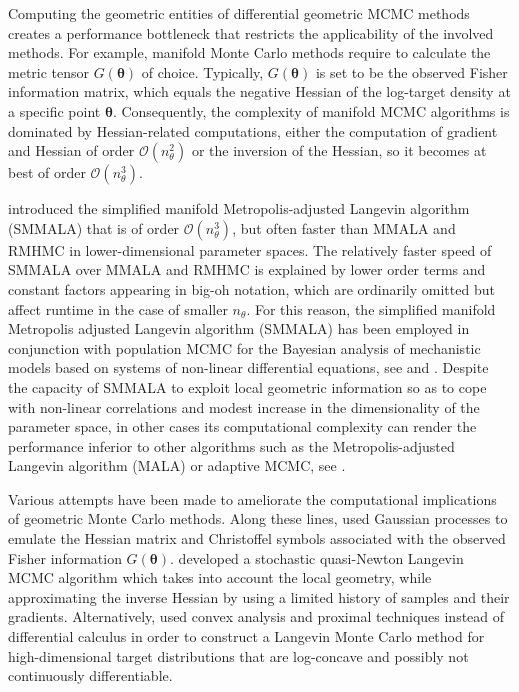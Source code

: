 \documentclass[twoside,11pt]{article}
\begin{document}
Computing the geometric entities of differential geometric MCMC methods creates a performance bottleneck that restricts the 
applicability of the involved methods. For example, manifold Monte Carlo methods require to calculate the metric tensor
$G(\boldsymbol{\theta})$ of choice. Typically, $G(\boldsymbol{\theta})$ is set to be the observed Fisher information matrix,
which equals the negative Hessian of the log-target density at a specific point $\boldsymbol{\theta}$.
Consequently, the complexity of manifold MCMC algorithms is dominated by Hessian-related computations, either the computation of gradient and Hessian of order  $\mathcal{O}(n_\theta^2)$ or the inversion of the Hessian, so it becomes at best of order $\mathcal{O}(n_\theta^3)$.

\cite{gir_cal__rie} introduced the simplified manifold Metropolis-adjusted Langevin algorithm (SMMALA) that is of order $\mathcal{O}(n_\theta^3)$, but often faster than MMALA and RMHMC in lower-dimensional parameter spaces. The 
relatively faster speed of SMMALA over MMALA and RMHMC is explained by lower order terms and constant factors appearing in 
big-oh notation, which are ordinarily omitted but affect runtime in the case of smaller $n_\theta$. For this reason, the 
simplified manifold Metropolis adjusted Langevin algorithm (SMMALA) has been employed in conjunction with population MCMC 
for the Bayesian analysis of mechanistic models based on systems of non-linear differential equations, see 
\cite{cal_gir__sta} and \cite{sch_pap__ews}. Despite the capacity of SMMALA to exploit local geometric information so as to 
cope with non-linear correlations and modest increase in the dimensionality of the parameter space, in other cases its 
computational complexity can render the performance inferior to other algorithms such as the Metropolis-adjusted Langevin 
algorithm (MALA) or adaptive MCMC, see \cite{cal_eps_sil__bay}.

Various attempts have been made to ameliorate the computational implications of geometric Monte Carlo methods. Along these 
lines, \cite{lan_tha_chr__emu} used Gaussian processes to emulate the Hessian matrix and Christoffel symbols associated with 
the observed Fisher information $G(\boldsymbol{\theta})$. \cite{sim_bad_cem__sto} developed a stochastic quasi-Newton 
Langevin MCMC algorithm which takes into account the local geometry, while approximating the inverse Hessian by using a 
limited history of samples and their gradients. Alternatively, \cite{per__prox} used convex analysis and proximal techniques 
instead of differential calculus in order to construct a Langevin Monte Carlo method for high-dimensional target 
distributions that are log-concave and possibly not continuously differentiable.
\end{document}
